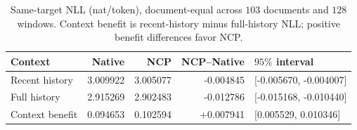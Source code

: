 \begin{table}[ht]
\centering\small
\caption{Same-target NLL (nat/token), document-equal across $103$ documents and $128$ windows. Context benefit is recent-history minus full-history NLL; positive benefit differences favor NCP.}
\label{tab:ncp-context}
\begin{tabular}{@{}lrrrl@{}}
\toprule
Context & Native & NCP & NCP--Native & $95\%$ interval \\
\midrule
Recent history & 3.009922 & 3.005077 & -0.004845 & [-0.005670, -0.004007] \\
Full history & 2.915269 & 2.902483 & -0.012786 & [-0.015168, -0.010440] \\
Context benefit & 0.094653 & 0.102594 & +0.007941 & [0.005529, 0.010346] \\
\bottomrule
\end{tabular}
\end{table}

